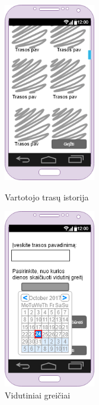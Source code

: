 \documentclass[oneside]{VUMIFPSkursinis}
\begin{document}
\begin{figure}[h]
\centering
\parbox{5cm}{
\includegraphics[width=4cm]{ManoTrasuIstorija.png}
\caption{Vartotojo trasų istorija}
\label{fig:2figsA}}
\qquad
\begin{minipage}{5cm}
\includegraphics[width=4cm]{VidutiniaiGreičiai.png}
\caption{Vidutiniai greičiai}
\label{fig:2figsB}
\end{minipage}
\end{figure}
\end{document}
